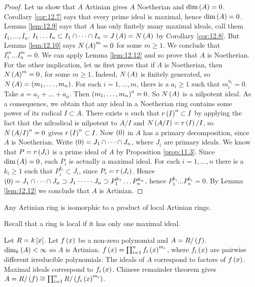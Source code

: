 \begin{proof}
Let us show that $ A $ Artinian gives $ A $ Noetherian and $ \dim\rb{A} = 0 $. Corollary \ref{cor:12.7} says that every prime ideal is maximal, hence $ \dim\rb{A} = 0 $. Lemma \ref{lem:12.9} says that $ A $ has only finitely many maximal ideals, call them $ I_1, \dots, I_n $. $ I_1 \dots I_n \subset I_1 \cap \dots \cap I_n = J\rb{A} = N\rb{A} $ by Corollary \ref{cor:12.8}. But Lemma \ref{lem:12.10} says $ N\rb{A}^m = 0 $ for some $ m \ge 1 $. We conclude that $ I_1^m \dots I_n^m = 0 $. We can apply Lemma \ref{lem:12.12} and so prove that $ A $ is Noetherian. For the other implication, let us first prove that if $ A $ is Noetherian, then $ N\rb{A}^m = 0 $, for some $ m \ge 1 $. Indeed, $ N\rb{A} $ is finitely generated, so $ N\rb{A} = \rb{m_1, \dots, m_n} $. For each $ i = 1, \dots, m $, there is a $ a_i \ge 1 $ such that $ m_i^{a_i} = 0 $. Take $ a = a_1 + \dots + a_n $. Then $ \rb{m_1, \dots, m_n}^a = 0 $. So $ N\rb{A} $ is a nilpotent ideal. As a consequence, we obtain that any ideal in a Noetherian ring contains some power of its radical $ I \subset A $. There exists $ n $ such that $ r\rb{I}^n \subset I $ by applying the fact that the nilradical is nilpotent to $ A / I $ and $ N\rb{A / I} = r\rb{I} / I $, so $ N\rb{A / I}^n = 0 $ gives $ r\rb{I}^n \subset I $. Now $ \rb{0} $ in $ A $ has a primary decomposition, since $ A $ is Noetherian. Write $ \rb{0} = J_1 \cap \dots \cap J_n $, where $ J_i $ are primary ideals. We know that $ P = r\rb{J_i} $ is a prime ideal of $ A $ by Proposition \ref{prop:11.3}. Since $ \dim\rb{A} = 0 $, each $ P_i $ is actually a maximal ideal. For each $ i = 1, \dots, n $ there is a $ k_i \ge 1 $ such that $ P_i^{k_i} \subset J_i $, since $ P_i = r\rb{J_i} $. Hence $ \rb{0} = J_1 \cap \dots \cap J_n \supset J_1 \cdot \dots \cdot J_n \supset P_1^{k_1} \dots P_n^{k_n} $, hence $ P_1^{k_1} \dots P_n^{k_n} = 0 $. By Lemma \ref{lem:12.12} we conclude that $ A $ is Artinian.
\end{proof}

\pagebreak


\begin{theorem}
\label{thm:12.15}
Any Artinian ring is isomorphic to a product of local Artinian rings.
\end{theorem}

Recall that a ring is local if it has only one maximal ideal.

\begin{example*}
Let $ R = k\sb{x} $. Let $ f\rb{x} $ be a non-zero polynomial and $ A = R / \rb{f} $. $ \dim_k\rb{A} < \infty $ so $ A $ is Artinian. $ f\rb{x} = \prod_{i = 1}^n f_i\rb{x}^{m_i} $, where $ f_i\rb{x} $ are pairwise different irreducible polynomials. The ideals of $ A $ correspond to factors of $ f\rb{x} $. Maximal ideals correspond to $ f_i\rb{x} $. Chinese remainder theorem gives $ A = R / \rb{f} \cong \prod_{i = 1}^n R / \rb{f_i\rb{x}^{m_i}} $.
\end{example*}

